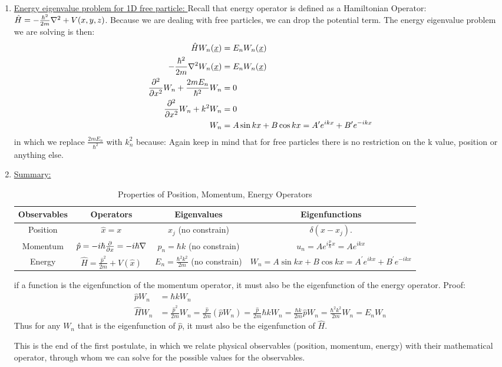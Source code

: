 \documentclass{school-22.101-notes}
\begin{document}
\begin{enumerate}
\item \uline{Energy eigenvalue problem for 1D free particle: }
Recall that energy operator is defined as a Hamiltonian Operator: $\hat{H}  = -\frac{\hbar^2}{2m} \nabla^2 + V(x,y,z)$. Because we are dealing with free particles, we can drop the potential term. The energy eigenvalue problem we are solving is then: 
\begin{align}
 \hat{H} W_n (\underline{x}) &= E_n W_n (\underline{x} ) \\
 -\frac{\hbar^2}{2m} \nabla^2 W_n (\underline{x}) &= E_n W_n (\underline{x} ) \\
 \frac{\partial^{2} }{\partial x ^{2}} W_n + \frac{2m E_n}{\hbar^2} W_n &= 0 \\
 \frac{\partial^{2} }{\partial x ^{2}} W_n + k^2 W_n &= 0  \\
 W_n &= A \sin kx + B \cos kx = A^{\prime} e^{ikx} + B^{\prime} e^{-ikx}
\end{align}
in which we replace $\frac{2m E_n}{\hbar^2}$ with $k_n^2$ because:
Again keep in mind that for free particles there is no restriction on the k value, position or anything else. 


\item \uline{Summary: }
\begin{table}
\begin{tabular}{|c|c|c|c|} \hline
Observables & Operators & Eigenvalues & Eigenfunctions \\ \hline
Position & $\hat{x} = x$ & $x_j$ (no constrain) & $\delta(x-x_j)$. \\ \hline
Momentum & $\hat{p} = -i\hbar \frac{\partial}{\partial x} = - i \hbar \nabla $ & $p_n = \hbar k$ (no constrain) & $u_n = A e^{i \frac{p}{\hbar} x } = A e^{i k x} $ \\ \hline
Energy & $\hat{H} = \frac{\hat{p}^2}{2m} + V(\hat{x}) $ & $E_n = \frac{\hbar^2 k^2}{2m}$ (no constrain) & $W_n = A \sin kx + B \cos kx = A^{\prime} e^{ikx} + B^{\prime} e^{-ikx} $\\ \hline
\end{tabular}
\caption{Properties of Position, Momentum, Energy Operators}
\end{table}

if a function is the eigenfunction of the momentum operator, it must also be the eigenfunction of the energy operator. Proof:
\begin{align}
\hat{p} W_n &= \hbar k W_n \\
\hat{H} W_n &= \frac{\hat{p}^2}{2m} W_n 
= \frac{\hat{p}}{2m} (\hat{p} W_n) 
= \frac{\hat{p}}{2m} \hbar k W_n = \frac{\hbar k}{2m} \hat{p} W_n = \frac{\hbar^2 k^2}{2m} W_n = E_n W_n
\end{align}
Thus for any $W_n$ that is the eigenfunction of $\hat{p}$, it must also be the eigenfunction of $\hat{H}$.

This is the end of the first postulate, in which we relate physical observables (position, momentum, energy) with their mathematical operator, through whom we can solve for the possible values for the observables. 
\end{enumerate}
\end{document}
